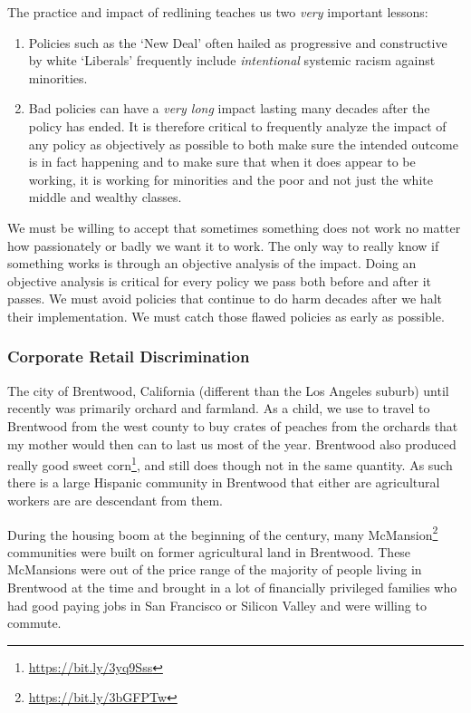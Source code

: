 The practice and impact of redlining teaches us two \emph{very} important lessons:

\begin{enumerate}
  \item Policies such as the `New Deal' often hailed as progressive and constructive by white `Liberals' frequently include \emph{intentional} systemic racism against minorities.
  \item Bad policies can have a \emph{very long} impact lasting many decades after the policy has ended. It is therefore critical to frequently analyze the impact of any policy as objectively as possible to both make sure the intended outcome is in fact happening and to make sure that when it does appear to be working, it is working for minorities and the poor and not just the white middle and wealthy classes.
\end{enumerate}

We must be willing to accept that sometimes something does not work no matter how passionately or badly we want it to work. The only way to really know if something works is through an objective analysis of the impact. Doing an objective analysis is critical for every policy we pass both before and after it passes. We must avoid policies that continue to do harm decades after we halt their implementation. We must catch those flawed policies as early as possible.

\subsubsection{Corporate Retail Discrimination}

The city of Brentwood, California (different than the Los Angeles suburb) until recently was primarily orchard and farmland. As a child, we use to travel to Brentwood from the west county to buy crates of peaches from the orchards that my mother would then can to last us most of the year. Brentwood also produced really good sweet corn\footnote{\url{https://bit.ly/3yq9Sss}}, and still does though not in the same quantity. As such there is a large Hispanic community in Brentwood that either are agricultural workers are are descendant from them.

During the housing boom at the beginning of the century, many McMansion\footnote{\url{https://bit.ly/3bGFPTw}} communities were built on former agricultural land in Brentwood. These McMansions were out of the price range of the majority of people living in Brentwood at the time and brought in a lot of financially privileged families who had good paying jobs in San Francisco or Silicon Valley and were willing to commute.

